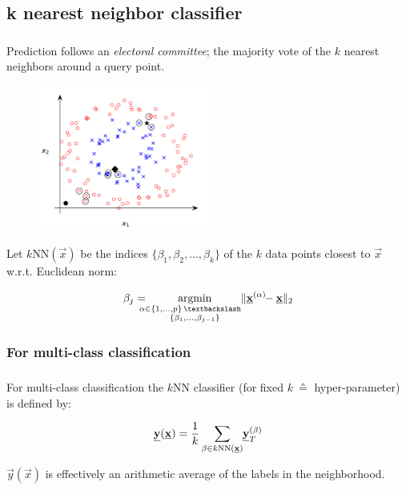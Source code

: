 \subsection{k nearest neighbor classifier}

\begin{frame}\frametitle{\subsecname}
Prediction follows an \emph{electoral committee}; the majority vote of the $k$ nearest neighbors around a query point.

\svspace{-4mm}

\begin{figure}[ht]
	\includegraphics[width=0.5\textwidth]{img/knn}
	\mode<article>{
	\caption{$k$NN with $k=3$}
	}
\end{figure}

\svspace{-5mm}

Let $k$NN$(\vec x)$ be the indices $\{\beta_1, \beta_2,\ldots,\beta_k\}$ of the $k$ data points closest to $\vec x$ w.r.t. Euclidean norm:

\svspace{-5mm}

\begin{equation}
\beta_j = 
\argmin_{\substack{\kern-2ex \alpha \in \{1,\ldots,p\} \,\textbackslash\\ \{\beta_{1},\ldots,\beta_{j-1}\}}}
\lVert \vec x^{(\alpha)} \kern-.8ex - \vec x\rVert_{2}
\end{equation}

\end{frame}

\subsubsection{For multi-class classification}

\begin{frame}\frametitle{\subsubsecname}

For multi-class classification the $k$NN classifier (for fixed $k~\corresponds$ hyper-parameter) is defined by:

\begin{equation}
\vec y(\vec x) = \frac{1}{k} \sum_{\beta \in k\mathrm{NN}(\vec x)} \kern-0.5ex \vec y_{T}^{(\beta)}
\label{eq:knn_classifier}
\end{equation}

$\vec y(\vec x)$  is effectively an arithmetic average of the labels in the neighborhood.

\end{frame}

